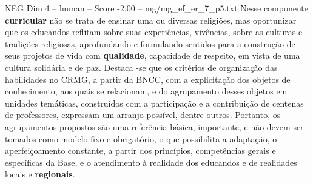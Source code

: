 \begin{textsample}{NEG Dim 4 – human – Score -2.00 – mg/mg\_ef\_er\_7\_p5.txt}  \label{ex:f4_neg_009}
Nesse componente \textbf{curricular} não se trata de ensinar uma ou diversas religiões, mas oportunizar que os educandos reflitam sobre suas experiências, vivências, sobre as culturas e tradições religiosas, aprofundando e formulando sentidos para a construção de seus projetos de vida com \textbf{qualidade}, capacidade de respeito, em vista de uma cultura solidária e de paz.
Destaca -se que os critérios de organização das habilidades no CRMG, a partir da BNCC, com a explicitação dos objetos de conhecimento, aos quais se relacionam, e do agrupamento desses objetos em unidades temáticas, construídos com a participação e a contribuição de centenas de professores, expressam um arranjo possível, dentre outros.
Portanto, os agrupamentos propostos são uma referência básica, importante, e não devem ser tomados como modelo fixo e obrigatório, o que possibilita a adaptação, o aperfeiçoamento constante, a partir dos princípios, competências gerais e específicas da Base, e o atendimento à realidade dos educandos e de realidades locais e \textbf{regionais}.

\end{textsample}
